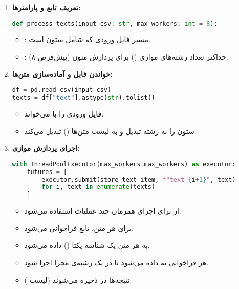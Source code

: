 \documentclass{article}
\begin{document}
\begin{enumerate}
    \item \textbf{تعریف تابع و پارامترها:}
    \begin{latin}
    \begin{lstlisting}[language=Python]
def process_texts(input_csv: str, max_workers: int = 8):
    \end{lstlisting}
    \end{latin}
    \begin{itemize}
        \item {}: مسیر فایل  ورودی که شامل ستون  است.
        \item {}: حداکثر تعداد رشته‌های موازی () برای پردازش متون (پیش‌فرض ۸).
    \end{itemize}

    \item \textbf{خواندن فایل  و آماده‌سازی متن‌ها:}
    \begin{latin}
    \begin{lstlisting}[language=Python]
df = pd.read_csv(input_csv)
texts = df["text"].astype(str).tolist()
    \end{lstlisting}
    \end{latin}
    \begin{itemize}
        \item فایل  ورودی را با  می‌خواند.
        \item ستون  را به رشته تبدیل و به لیست متن‌ها () تبدیل می‌کند.
    \end{itemize}

    \item \textbf{اجرای پردازش موازی:}
    \begin{latin}
    \begin{lstlisting}[language=Python]
with ThreadPoolExecutor(max_workers=max_workers) as executor:
    futures = [
        executor.submit(store_text_item, f"text_{i+1}", text)
        for i, text in enumerate(texts)
    ]
    \end{lstlisting}
    \end{latin}
    \begin{itemize}
        \item از  برای اجرای همزمان چند عملیات استفاده می‌شود.
        \item برای هر متن، تابع  فراخوانی می‌شود.
        \item به هر متن یک شناسه یکتا () داده می‌شود.
        \item هر فراخوانی به  داده می‌شود تا در یک رشته‌ی مجزا اجرا شود.
        \item نتیجه‌ها در  ذخیره می‌شوند (لیست ).
    \end{itemize}


\end{enumerate}
\end{document}
